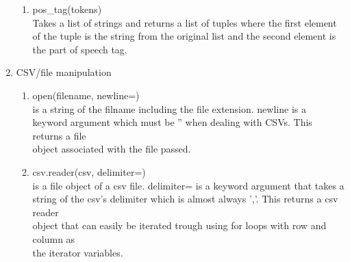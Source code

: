 \documentclass[11pt, letterpaper, onecolumn, oneside, final]{article}
\begin{document}
\begin{enumerate}
\begin{enumerate}
    \item {\consolas pos_tag(tokens)}\\
    \hspace*{8mm}Takes a list of strings and returns a list of tuples where the first element of the tuple is the string from the original list and the second element is the part of speech tag.
    
\end{enumerate}


\item CSV/file manipulation
\begin{enumerate}
    \item {\consolas open(filename, newline=)}\\
    \hspace*{8mm}{\consolas filename} is a string of the filname including the file extension. {\consolas newline} is a\\
    \hspace*{8mm}keyword argument which must be {\consolas''} when dealing with CSVs. This returns a file\\
    \hspace*{8mm}object associated with the file passed. 
    
    \item {\consolas csv.reader(csv, delimiter=)}\\
    \hspace*{8mm}{\consolas csv} is a file object of a csv file. {\consolas delimiter=} is a keyword argument that takes a\\
    \hspace*{8mm}string of the csv's delimiter which is almost always {\consolas ','}. This returns a csv reader\\
    \hspace*{8mm}object that can easily be iterated trough using for loops with  {\consolas row} and  {\consolas column} as\\
    \hspace*{8mm}the iterator variables.  
\end{enumerate}

\end{enumerate}
\end{document}
